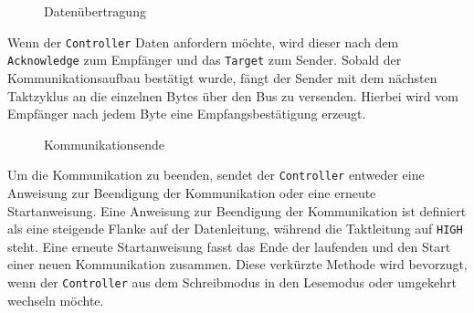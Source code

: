 \begin{wrapfigure}{r}{.45\textwidth}
	\centering
	\scalebox{1.25}{}
	
	\caption{Datenübertragung}
	\label{i2c-data}
\end{wrapfigure}
Wenn der \texttt{Controller} Daten anfordern möchte, wird dieser nach dem \texttt{Acknowledge} zum Empfänger und das \texttt{Target} zum Sender.
Sobald der Kommunikationsaufbau bestätigt wurde, fängt der Sender mit dem nächsten Taktzyklus an die einzelnen Bytes über den Bus zu versenden.
Hierbei wird vom Empfänger nach jedem Byte eine Empfangsbestätigung erzeugt.

\begin{wrapfigure}{r}{.45\textwidth}
	\centering
	\scalebox{1.25}{}
	\scalebox{1.25}{}
	
	\caption{Kommunikationsende}
	\label{i2c-stop}
\end{wrapfigure}
Um die Kommunikation zu beenden, sendet der \texttt{Controller} entweder eine Anweisung zur Beendigung der Kommunikation oder eine erneute Startanweisung.
Eine Anweisung zur Beendigung der Kommunikation ist definiert als eine steigende Flanke auf der Datenleitung, während die Taktleitung auf \texttt{HIGH} steht.
Eine erneute Startanweisung fasst das Ende der laufenden und den Start einer neuen Kommunikation zusammen.
Diese verkürzte Methode wird bevorzugt, wenn der \texttt{Controller} aus dem Schreibmodus in den Lesemodus oder umgekehrt wechseln möchte.

\cite{I2C-spec_userManual}
